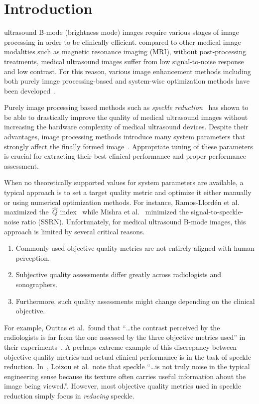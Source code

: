 
\section{Introduction}\label{section:introduction}
 ultrasound B-mode (brightness mode) images require various stages of image processing in order to be clinically efficient.
compared to other medical image modalities such as magnetic resonance imaging (MRI), without post-processing treatments, medical ultrasound images suffer from low signal-to-noise response and low contrast.
For this reason, various image enhancement methods including both purely image processing-based and system-wise optimization methods have been developed~\cite{contrerasortiz_ultrasound_2012}.

Purely image processing based methods such as \textit{speckle reduction}~\cite{finn_echocardiographic_2011, duarte-salazar_speckle_2020} has shown to be able to drastically improve the quality of medical ultrasound images without increasing the hardware complexity of medical ultrasound devices. 
Despite their advantages, image processing methods introduce many system parameters that strongly affect the finally formed image~\cite{duarte-salazar_speckle_2020}.
Appropriate tuning of these parameters is crucial for extracting their best clinical performance and proper performance assessment.

When no theoretically supported values for system parameters are available, a typical approach is to set a target quality metric and optimize it either manually or using numerical optimization methods. For instance, Ramos-Llord\'en et al.~\cite{ramos-llorden_anisotropic_2015} maximized the~\(\widehat{Q}\) index~\cite{tay_ultrasound_2006} while Mishra et al.~\cite{mishra_edge_2018} minimized the signal-to-speckle-noise ratio (SSRN).
Unfortunately, for medical ultrasound B-mode images, this approach is limited by several critical reasons.
\begin{enumerate}
  \item Commonly used objective quality metrics are not entirely aligned with human perception.
  \item Subjective quality assessments differ greatly across radiologists and sonographers.
  \item Furthermore, such quality assessments might change depending on the clinical objective.
\end{enumerate}
For example, Outtas et al.~found that ``\ldots the contrast perceived by the radiologists is far from the one assessed by the three objective metrics used'' in their experiments~\cite{outtas_subjective_2018}.
A perhaps extreme example of this discrepancy between objective quality metrics and actual clinical performance is in the task of speckle reduction.
In~\cite{loizou_comparative_2005}, Loizou et al.~note that speckle ``\ldots is not truly noise in the typical engineering sense because its texture often carries useful information about the image being viewed.''.
However, most objective quality metrics used in speckle reduction simply focus in \textit{reducing} speckle.

